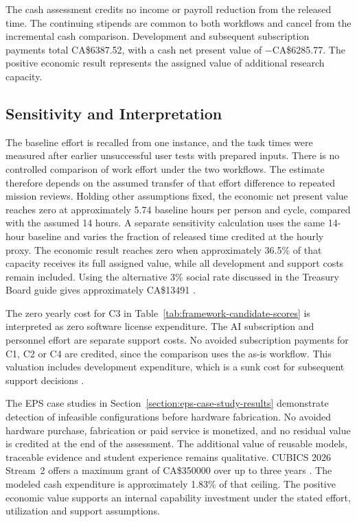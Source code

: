 The cash assessment credits no income or payroll reduction from the released time.
The continuing stipends are common to both workflows and cancel from the incremental cash comparison.
Development and subsequent subscription payments total CA\$6387.52, with a cash net present value of $-$CA\$6285.77.
The positive economic result represents the assigned value of additional research capacity.

\subsection{Sensitivity and Interpretation}

The baseline effort is recalled from one instance, and the task times were measured after earlier unsuccessful user tests with prepared inputs.
There is no controlled comparison of work effort under the two workflows.
The estimate therefore depends on the assumed transfer of that effort difference to repeated mission reviews.
Holding other assumptions fixed, the economic net present value reaches zero at approximately 5.74 baseline hours per person and cycle, compared with the assumed 14 hours.
A separate sensitivity calculation uses the same 14-hour baseline and varies the fraction of released time credited at the hourly proxy.
The economic result reaches zero when approximately 36.5\% of that capacity receives its full assigned value, while all development and support costs remain included.
Using the alternative 3\% social rate discussed in the Treasury Board guide gives approximately CA\$13491 \citep[Sec.~6.1]{tbs2019costbenefit}.

The zero yearly cost for C3 in Table~\ref{tab:framework-candidate-scores} is interpreted as zero software license expenditure.
The AI subscription and personnel effort are separate support costs.
No avoided subscription payments for C1, C2 or C4 are credited, since the comparison uses the as-is workflow.
This valuation includes development expenditure, which is a sunk cost for subsequent support decisions \citep[Chap.~17, App.~A]{ulrich2013diseno}.

The EPS case studies in Section~\ref{section:eps-case-study-results} demonstrate detection of infeasible configurations before hardware fabrication.
No avoided hardware purchase, fabrication or paid service is monetized, and no residual value is credited at the end of the assessment.
The additional value of reusable models, traceable evidence and student experience remains qualitative.
CUBICS 2026 Stream~2 offers a maximum grant of CA\$350000 over up to three years \citep[Sec.~7.1]{csa2026cubics}.
The modeled cash expenditure is approximately 1.83\% of that ceiling.
The positive economic value supports an internal capability investment under the stated effort, utilization and support assumptions.
